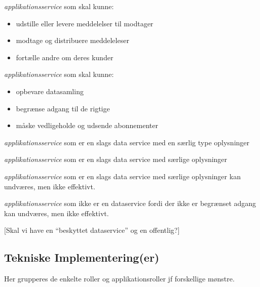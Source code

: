 \begin{description}
\tightlist
\item[eDelivery Service Provider]
\emph{applikationsservice} som skal kunne:
\end{description}

\begin{itemize}
\tightlist
\item
  udstille eller levere meddelelser til modtager
\item
  modtage og distribuere meddeleleser
\item
  fortælle andre om deres kunder
\end{itemize}

\begin{description}
\tightlist
\item[Dataservice]
\emph{applikationsservice} som skal kunne:
\end{description}

\begin{itemize}
\tightlist
\item
  opbevare datasamling
\item
  begrænse adgang til de rigtige
\item
  måske vedligeholde og udsende abonnementer
\end{itemize}

\begin{description}
\tightlist
\item[Kontaktregister]
\emph{applikationsservice} som er en slags data service med en særlig
type oplysninger
\item[Log]
\emph{applikationsservice} som er en slags data service med særlige
oplysninger
\item[Indeks]
\emph{applikationsservice} som er en slags data service med særlige
oplysninger kan undværes, men ikke effektivt.
\item[Katalog]
\emph{applikationsservice} som ikke er en dataservice fordi der ikke er
begrænset adgang kan undværes, men ikke effektivt.
\end{description}

{[}Skal vi have en ``beskyttet dataservice'' og en offentlig?{]}

\subsection{Tekniske
Implementering(er)}\label{tekniske-implementeringer}

Her grupperes de enkelte roller og applikationsroller jf forskellige
mønstre.

